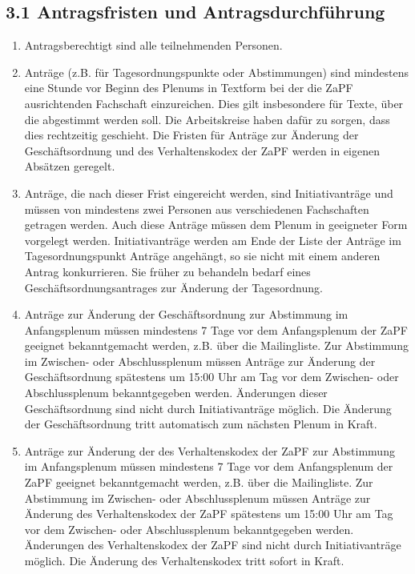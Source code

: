 \documentclass[12pt,oneside]{scrartcl}
\begin{document}
\subsection{3.1 Antragsfristen und Antragsdurchführung%
  \label{antragsfristen-und-antragsdurchfuhrung}%
}

\begin{enumerate}
\item Antragsberechtigt sind alle teilnehmenden Personen.

\item Anträge (z.B. für Tagesordnungspunkte oder Abstimmungen) sind mindestens
eine Stunde vor Beginn des Plenums in Textform bei der die ZaPF
ausrichtenden Fachschaft einzureichen.
Dies gilt insbesondere für Texte, über die abgestimmt werden soll.
Die Arbeitskreise haben dafür zu sorgen, dass dies rechtzeitig geschieht.
Die Fristen für Anträge zur Änderung der Geschäftsordnung und des
Verhaltenskodex der ZaPF werden in eigenen Absätzen geregelt.

\item Anträge, die nach dieser Frist eingereicht werden, sind Initiativanträge
und müssen von mindestens zwei Personen aus verschiedenen Fachschaften
getragen werden.
Auch diese Anträge müssen dem Plenum in geeigneter Form vorgelegt werden.
Initiativanträge werden am Ende der Liste der Anträge im Tagesordnungspunkt
\textquotedbl{}Anträge\textquotedbl{} angehängt, so sie nicht mit einem anderen Antrag konkurrieren.
Sie früher zu behandeln bedarf eines Geschäftsordnungsantrages zur Änderung
der Tagesordnung.

\item Anträge zur Änderung der Geschäftsordnung zur Abstimmung im Anfangsplenum
müssen mindestens 7 Tage vor dem Anfangsplenum der ZaPF geeignet
bekanntgemacht werden, z.B. über die Mailingliste.
Zur Abstimmung im Zwischen- oder Abschlussplenum müssen Anträge zur Änderung
der Geschäftsordnung spätestens um 15:00 Uhr am Tag vor dem Zwischen- oder
Abschlussplenum bekanntgegeben werden.
Änderungen dieser Geschäftsordnung sind nicht durch Initiativanträge möglich.
Die Änderung der Geschäftsordnung tritt automatisch zum nächsten Plenum in Kraft.

\item Anträge zur Änderung der des Verhaltenskodex der ZaPF zur Abstimmung im Anfangsplenum
müssen mindestens 7 Tage vor dem Anfangsplenum der ZaPF geeignet
bekanntgemacht werden, z.B. über die Mailingliste.
Zur Abstimmung im Zwischen- oder Abschlussplenum müssen Anträge zur Änderung
des Verhaltenskodex der ZaPF spätestens um 15:00 Uhr am Tag vor dem Zwischen- oder
Abschlussplenum bekanntgegeben werden.
Änderungen des Verhaltenskodex der ZaPF sind nicht durch Initiativanträge möglich.
Die Änderung des Verhaltenskodex tritt sofort in Kraft.


\end{enumerate}
\end{document}
